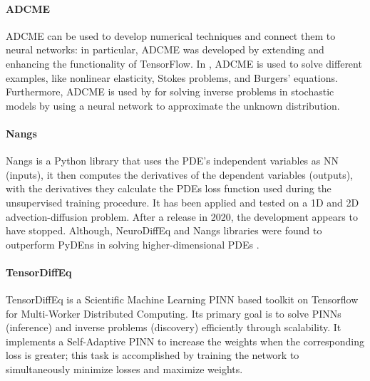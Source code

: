 \documentclass[pdflatex,sn-basic]{sn-jnl}%
\theoremstyle{thmstyleone}%
\theoremstyle{thmstyletwo}%
\theoremstyle{thmstylethree}%
\begin{document}
\paragraph{ADCME} %

%
ADCME \citep{Xu2020_AdcmeLearningSpatially_DarXD} can be used to develop numerical techniques and connect them to neural networks: in particular, ADCME was developed by extending and enhancing the functionality of TensorFlow. 
%
In \cite{Xu2020_AdcmeLearningSpatially_DarXD}, ADCME is used to solve different examples, like nonlinear elasticity, Stokes problems, and Burgers' equations.
Furthermore, ADCME is used by \cite{Xu2021_SolvingInverseProblems_DarXD} for solving inverse problems in stochastic models by using a neural network to approximate the unknown distribution.



\paragraph{Nangs} %
Nangs \citep{Ped2019_SolvingPartialDifferential_MarPMP} is a Python library that uses the PDE's independent variables as NN  (inputs), it then computes the derivatives of the dependent variables (outputs), with the derivatives they calculate the PDEs loss function used during the unsupervised training procedure. 
%
It has been applied and tested on a 1D and 2D advection-diffusion problem.
After a release in 2020, the development appears to have stopped. 
Although, NeuroDiffEq and Nangs libraries were found to outperform PyDEns in solving higher-dimensional PDEs
\citep{Pra2021_AnnsBasedMethod_BakPBMM}.




\paragraph{TensorDiffEq}  %
TensorDiffEq \citep{mcclenny2021tensordiffeq} is a Scientific Machine Learning PINN based toolkit on Tensorflow for Multi-Worker Distributed Computing.
Its primary goal is to solve PINNs (inference) and inverse problems (discovery) efficiently through scalability.
It implements a Self-Adaptive PINN to increase the weights when the corresponding loss is greater; this task is accomplished by training the network to simultaneously minimize losses and maximize weights.
\end{document}
